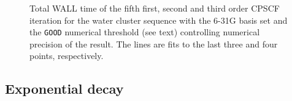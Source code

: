 \documentclass[twocolumn,showpacs,preprintnumbers,amsmath,amssymb]{revtex4}
\begin{document}
\begin{figure}[t]
  \caption{\protect
    Total WALL time of the fifth first, second and third order
    CPSCF iteration for the water cluster sequence with the 6-31G
    basis set and the {\tt GOOD} numerical threshold (see text) 
    controlling numerical precision of the result. The lines
    are fits to the last three and four points, respectively.
  }\label{Alpha_scaling}
\end{figure}



\subsection{Exponential decay}
\end{document}
